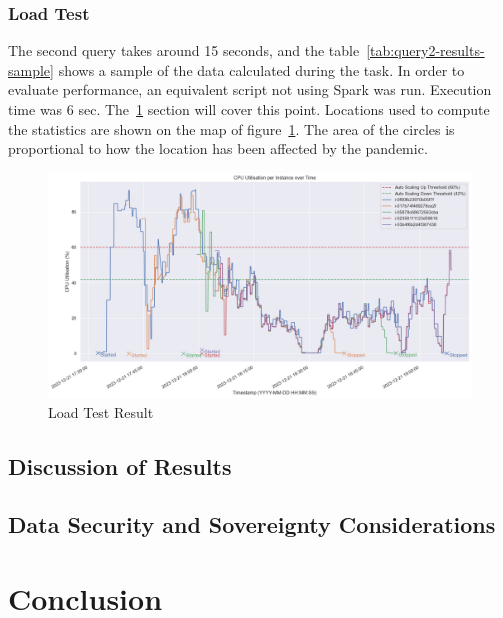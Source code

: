 \documentclass[12pt,oneside]{book} %
\begin{document}
\newpage
\subsection{Load Test}

The second query takes around 15 seconds, and the
table~\ref{tab:query2-results-sample} shows a sample of the data calculated
during the task. In order to evaluate performance, an equivalent script not
using Spark was run. Execution time was 6 sec.
The~\ref{sec:discussion-of-results} section will cover this point. Locations
used to compute the statistics are shown on the map of
figure~\ref{fig:top-100-locations-most-affected}. The area of the circles is
proportional to how the location has been affected by the pandemic.

\begin{figure}[H]
    \centering
    \includegraphics[width=1\linewidth]{images/autoscaling-test.png}
    \caption{Load Test Result}\label{fig:top-100-locations-most-affected}
\end{figure}

\newpage

\section{Discussion of Results}\label{sec:discussion-of-results}


\newpage
\section{Data Security and Sovereignty Considerations}

\newpage
\chapter{Conclusion}
\end{document}
